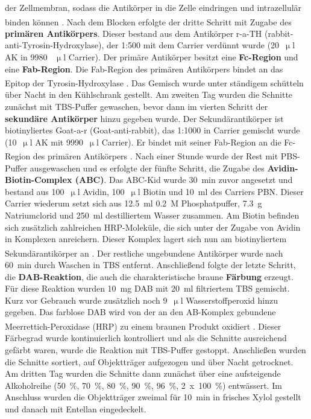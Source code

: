 der Zellmembran, sodass die Antikörper in die Zelle eindringen und intrazellulär binden können \textsuperscript{\cite{burry2009immunocytochemistry}}. Nach dem Blocken erfolgte der dritte Schritt mit Zugabe des \textbf{primären Antikörpers}. Dieser bestand aus dem Antikörper r-a-TH (rabbit-anti-Tyrosin-Hydroxylase), der 1:500 mit dem Carrier verdünnt wurde (20~$\upmu$l AK in 9980 ~$\upmu$l Carrier). Der primäre Antikörper besitzt eine \textbf{Fc-Region} und eine \textbf{Fab-Region}. Die Fab-Region des primären Antikörpers bindet an das Epitop der Tyrosin-Hydroxylase \textsuperscript{\cite{burry2009immunocytochemistry}}. Das Gemisch wurde unter ständigem schütteln über Nacht in den Kühlschrank gestellt. Am zweiten Tag wurden die Schnitte zunächst mit TBS-Puffer gewaschen, bevor dann im vierten Schritt der \textbf{sekundäre Antikörper} hinzu gegeben wurde. Der Sekundärantikörper ist biotinyliertes Goat-a-r (Goat-anti-rabbit), das 1:1000 in Carrier gemischt wurde (10~$\upmu$l AK mit 9990~$\upmu$l Carrier). Er bindet mit seiner Fab-Region an die Fc-Region des primären Antikörpers \textsuperscript{\cite{burry2009immunocytochemistry}}. Nach einer Stunde wurde der Rest mit PBS-Puffer ausgewaschen und es erfolgte der fünfte Schritt, die Zugabe des \textbf{Avidin-Biotin-Complex (ABC)}. Das ABC-Kid wurde 30~min zuvor angesetzt und bestand aus  100~$\upmu$l Avidin, 100~$\upmu$l Biotin und 10~ml des Carriers PBN. Dieser Carrier wiederum setzt sich aus 12.5~ml 0.2~M Phosphatpuffer, 7.3~g Natriumclorid und 250~ml destilliertem Wasser zusammen. Am Biotin befinden sich zusätzlich zahlreichen HRP-Moleküle, die sich unter der Zugabe von Avidin in Komplexen anreichern. Dieser Komplex lagert sich nun am biotinyliertem Sekundärantikörper an \textsuperscript{\cite{burry2009immunocytochemistry}}. Der restliche ungebundene Antikörper wurde nach 60~min durch Waschen in TBS entfernt. Anschließend folgte der letzte Schritt, die \textbf{DAB-Reaktion}, die auch die charakteristische braune \textbf{Färbung} erzeugt. Für diese Reaktion wurden 10~mg DAB mit 20~ml filtriertem TBS gemischt. Kurz vor Gebrauch wurde zusätzlich noch 9~$\upmu$l Wasserstoffperoxid hinzu gegeben. Das farblose DAB wird von der an den AB-Komplex gebundene Meerrettich-Peroxidase (HRP) zu einem braunen Produkt oxidiert \textsuperscript{\cite{burry2009immunocytochemistry}}. Dieser Färbegrad wurde kontinuierlich kontrolliert und als die Schnitte ausreichend gefärbt waren, wurde die Reaktion mit TBS-Puffer gestoppt. Anschließen wurden die Schnitte sortiert, auf Objektträger aufgezogen und über Nacht getrocknet. Am dritten Tag wurden die Schnitte dann zunächst über eine aufsteigende Alkoholreihe (50~\%, 70~\%, 80~\%, 90~\%, 96~\%, 2~x~100~\%) entwässert. Im Anschluss wurden die Objektträger zweimal für 10~min in frisches Xylol gestellt und danach mit Entellan eingedeckelt.  


